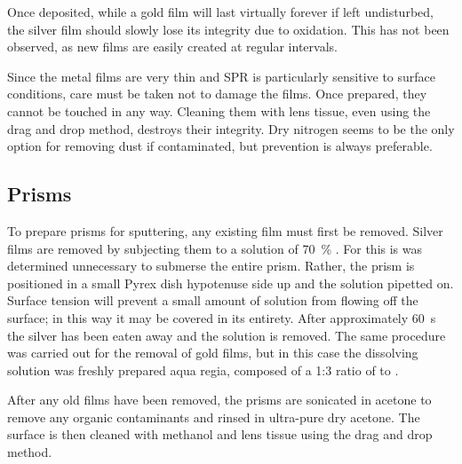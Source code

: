 Once deposited, while a gold film will last virtually forever if left
undisturbed, the silver film should slowly lose its integrity due to
oxidation.  This has not been observed, as new films are easily created at
regular intervals.  

Since the metal films are very thin and SPR is particularly sensitive to
surface conditions, care must be taken not to damage the films.  Once
prepared, they cannot be touched in any way.  Cleaning them with lens
tissue, even using the drag and drop method, destroys their integrity.  Dry
nitrogen seems to be the only option for removing dust if contaminated, but
prevention is always preferable.

\subsection{Prisms}
To prepare prisms for sputtering, any existing film must first be
removed.  Silver films are removed by subjecting them to a solution of
\SI{70}{\percent} .  For this is was determined unnecessary to
submerse the entire prism.  Rather, the prism is positioned in a small
Pyrex dish hypotenuse side up and the  solution pipetted on.
Surface tension will prevent a small amount of solution from flowing off
the surface; in this way it may be covered in its entirety.  After
approximately \SI{60}{\second} the silver has been eaten away and the
solution is removed.  The same procedure was carried out for the removal of
gold films, but in this case the dissolving solution was freshly prepared
aqua regia, composed of a 1:3 ratio of  to .

After any old films have been removed, the prisms are sonicated in acetone
to remove any organic contaminants and rinsed in ultra-pure dry acetone.
The surface is then cleaned with methanol and lens tissue using the drag
and drop method.

